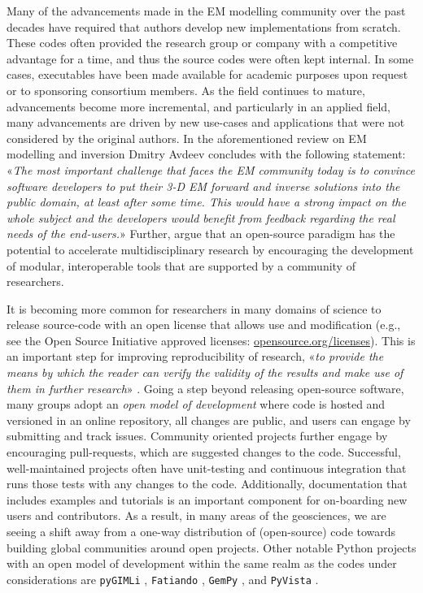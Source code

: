 \documentclass[
    paper,
  ]{geophysics}
\begin{document}
Many of the advancements made in the EM modelling community over the past decades have required that authors develop new implementations from scratch. These codes often provided the research group or company with a competitive advantage for a time, and thus the source codes were often kept internal. In some cases, executables have been made available for academic purposes upon request or to sponsoring consortium members. As the field continues to mature, advancements become more incremental, and particularly in an applied field, many advancements are driven by new use-cases and applications that were not considered by the original authors. In the aforementioned review on EM modelling and inversion Dmitry Avdeev concludes with the following statement: «\emph{The most important challenge that faces the EM community today is to convince software developers to put their 3-D EM forward and inverse solutions into the public domain, at least after some time. This would have a strong impact on the whole subject and the developers would benefit from feedback regarding the real needs of the end-users.}» Further, \cite{EXG.19.Oldenburg} argue that an open-source paradigm has the potential to accelerate multidisciplinary research by encouraging the development of modular, interoperable tools that are supported by a community of researchers.

It is becoming more common for researchers in many domains of science to release source-code with an open license that allows use and modification (e.g., see the Open Source Initiative approved licenses: \href{https://opensource.org/licenses}{opensource.org/licenses}). This is an important step for improving reproducibility of research, «\emph{to provide the means by which the reader can verify the validity of the results and make use of them in further research}» \citep{GEO.17.Broggini}. Going a step beyond releasing open-source software, many groups adopt an \emph{open model of development} where code is hosted and versioned in an online repository, all changes are public, and users can engage by submitting and track issues. Community oriented projects further engage by encouraging pull-requests, which are suggested changes to the code. Successful, well-maintained projects often have unit-testing and continuous integration that runs those tests with any changes to the code. Additionally, documentation that includes examples and tutorials is an important component for on-boarding new users and contributors. As a result, in many areas of the geosciences, we are seeing a shift away from a one-way distribution of (open-source) code towards building global communities around open projects. Other notable Python projects with an open model of development within the same realm as the codes under considerations are \texttt{pyGIMLi} \citep{CAG.17.Rucker}, \texttt{Fatiando} \citep{JOSS.18.Uieda}, \texttt{GemPy} \citep{GMD.19.DeLaVarga}, and \texttt{PyVista} \citep{JOSS.19.Sullivan}.
\end{document}
